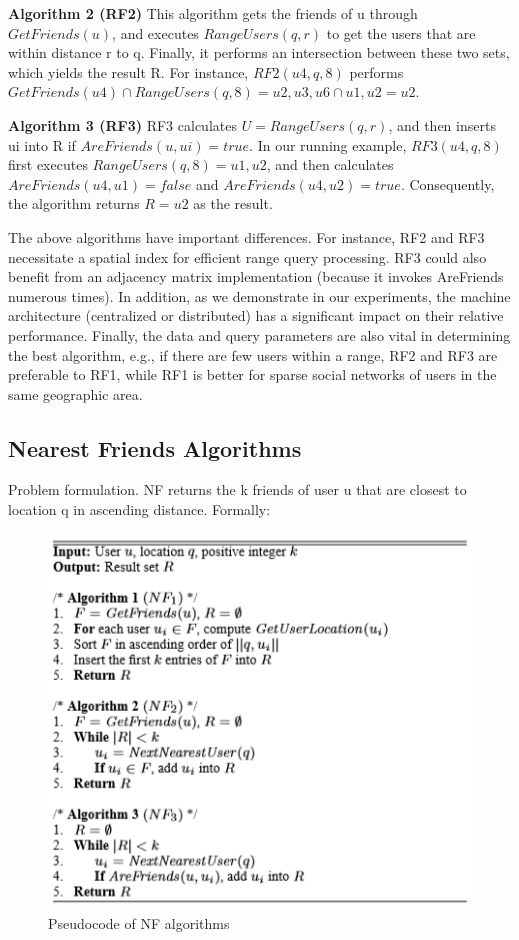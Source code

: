 \documentclass[prodmode,acmtods]{acmsmall} %
\begin{document}
\textbf{Algorithm 2 (RF2)}
\newline
This algorithm gets the friends of u through
$GetFriends(u)$, and executes $RangeUsers(q, r)$ to get the users
that are within distance r to q. Finally, it performs an intersection
between these two sets, which yields the result R. For instance,
$RF2(u4, q, 8)$ performs $GetFriends(u4) ∩ RangeUsers(q, 8) =
{u2, u3, u6} ∩ {u1, u2} = {u2}$.

\textbf{Algorithm 3 (RF3)}
\newline
RF3 calculates $U = RangeUsers(q, r)$, and
then inserts ui into R if $AreFriends(u, ui) = true.$ In our
running example, $RF3(u4, q, 8)$ first executes $RangeUsers(q, 8)
= {u1, u2}$, and then calculates $AreFriends(u4, u1) = false$ and
$AreFriends(u4, u2) = true$. Consequently, the algorithm returns
$R = {u2}$ as the result.


The above algorithms have important differences. For instance,
RF2 and RF3 necessitate a spatial index for efficient range query
processing. RF3 could also benefit from an adjacency matrix implementation
(because it invokes AreFriends numerous times). In
addition, as we demonstrate in our experiments, the machine architecture
(centralized or distributed) has a significant impact on their
relative performance. Finally, the data and query parameters are
also vital in determining the best algorithm, e.g., if there are few
users within a range, RF2 and RF3 are preferable to RF1, while
RF1 is better for sparse social networks of users in the same geographic
area.

\subsection{Nearest Friends Algorithms}

Problem formulation. NF returns the k friends of user u that are
closest to location q in ascending distance. Formally:

\begin{figure}[h]
\centering
\includegraphics[width=0.7\linewidth]{./graphics/NF_algorithm}
\caption{Pseudocode of NF algorithms}
\label{fig:NF_algorithm}
\end{figure}
\end{document}
